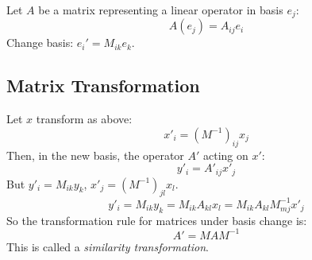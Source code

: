 \documentclass[12pt, a4paper]{report}
\begin{document}
Let $A$ be a matrix representing a linear operator in basis $e_j$:
\[
A(e_j) = A_{ij} e_i
\]
Change basis: $e_i' = M_{ik} e_k$.

\subsection*{Matrix Transformation}

Let $x$ transform as above:
\[
x'_i = (M^{-1})_{ij} x_j
\]
Then, in the new basis, the operator $A'$ acting on $x'$:
\[
y'_i = A'_{ij} x'_j
\]
But $y'_i = M_{ik} y_k$, $x'_j = (M^{-1})_{jl} x_l$.
\[
y'_i = M_{ik} y_k = M_{ik} A_{k l} x_l = M_{ik} A_{k l} M_{mj}^{-1} x'_j
\]
So the transformation rule for matrices under basis change is:
\[
A' = M A M^{-1}
\]
This is called a \textit{similarity transformation}.
\end{document}
